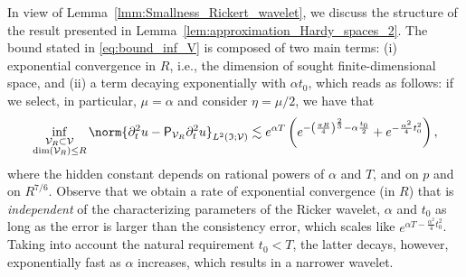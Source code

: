 \begin{remark}\label{rmk:dependence_alpha_t_0}
In view of Lemma~\ref{lmm:Smallness_Rickert_wavelet}, we discuss the structure of the 
result presented in Lemma~\ref{lem:approximation_Hardy_spaces_2}. 
The bound stated in \eqref{eq:bound_inf_V} is composed of two main terms: (i) exponential 
convergence in $R$, i.e., the dimension of sought finite-dimensional space, and (ii) a term decaying exponentially with $\alpha t_0$, which reads as follows: if we select, in particular, $\mu = \alpha$ and consider $\eta =\mu/2$, we have that
\begin{equation}
 \inf_{
	\substack{
		\mathcal{V}_R \subset \mathcal{V}
		\\
		\normalfont\text{dim}(\mathcal{V}_R)\leq R	
	}
	}	
	\norm{
		\partial^2_t u
		-
		\mathsf{P}_{\mathcal{V}_R}
		\partial^2_t u
	}_{L^2(\mathfrak{I};\mathcal{V})}
    \lesssim
    e^{{\alpha} T}
    \left(
    e^{
		-\left(\frac{\pi R }{4} \right)^{\frac{2}{3}}
        - {\alpha}  \frac{t_0}{2}
    }
    +
    e^{
         -
        \frac{\alpha^2}{4} t^2_0
    }
     \right),
\end{equation}
where the hidden constant depends on rational powers of $\alpha$ and $T$, and on $p$ and on $R^{7/6}$.
Observe that we obtain a rate of exponential convergence (in $R$) that is {\it independent}
of the characterizing parameters of the Ricker wavelet, $\alpha$ and $t_0$ as long as the error is larger than the consistency error, which scales like $e^{\alpha T-\frac{\alpha^2}{4} t_0^2}$. 
Taking into account the natural requirement $t_0<T$, the latter decays, however, exponentially fast as $\alpha$ increases,
which results in a narrower wavelet.
\end{remark}

